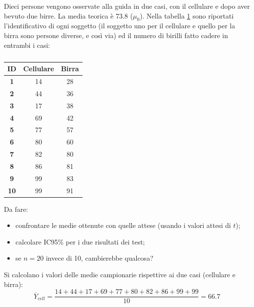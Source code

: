 \documentclass[10pt, draft]{book}
\newcommand{\tightlist}{%
\setlength{\itemsep}{1pt}\setlength{\parskip}{0pt}\setlength{\parsep}{0pt}}
\newcounter{example}[section]
\begin{document}
\begin{example}\label{esguida}
    Dieci persone vengono osservate alla guida in due casi, con il cellulare e dopo aver bevuto due birre. La media teorica è 73.8 ($\mu_0$). Nella tabella \ref{tabguida} sono riportati l'identificativo di ogni soggetto (il soggetto uno per il cellulare e quello per la birra sono persone diverse, e così via) ed il numero di birilli fatto cadere in entrambi i casi:
    \begin{table}[H]
        \centering
        \renewcommand\arraystretch{1.2}
        \begin{tabular}{c|c|c}
        \hline
        \textbf{ID}& \textbf{Cellulare} & \textbf{Birra}\\
        \hline
        \textbf{1} & 14 & 28\\
        \hline
        \textbf{2} & 44 & 36\\
        \hline
        \textbf{3} & 17 & 38\\
        \hline
        \textbf{4} & 69 & 42\\
        \hline
        \textbf{5} & 77 & 57\\
        \hline
        \textbf{6} & 80 & 60\\
        \hline
        \textbf{7} & 82 & 80\\
        \hline
        \textbf{8} & 86 & 81\\
        \hline
        \textbf{9} & 99 & 83\\
        \hline
        \textbf{10} & 99 & 91\\
        \hline
        \end{tabular}
        \caption{\small{}}
        \label{tabguida}
    \end{table}\noindent
    Da fare:
    \begin{itemize} \tightlist
        \item confrontare le medie ottenute con quelle attese (usando i valori attesi di $t$);
        \item calcolare IC95\% per i due risultati dei test;
        \item se $n = 20$ invece di 10, cambierebbe qualcosa?
    \end{itemize}
    Si calcolano i valori delle medie campionarie rispettive ai due casi (cellulare e birra):
    \begin{equation}
        \overline{Y}_{cell} = \frac{14+44+17+69+77+80+82+86+99+99}{10} = 66.7
    \end{equation}
    \begin{equation}

\end{equation}
\end{example}
\end{document}
